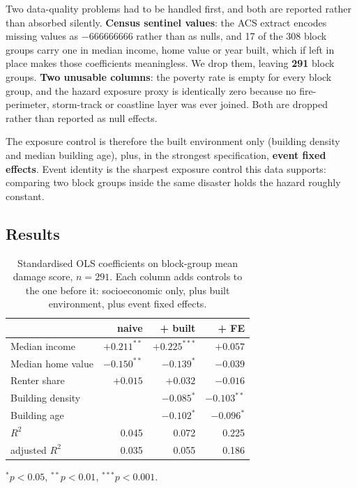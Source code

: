 \documentclass[10pt,twocolumn]{article}
\begin{document}
Two data-quality problems had to be handled first, and both are reported rather than absorbed
silently. \textbf{Census sentinel values}: the ACS extract encodes missing values as $-666666666$
rather than as nulls, and 17 of the 308 block groups carry one in median income, home value or year
built, which if left in place makes those coefficients meaningless. We drop them, leaving
\textbf{291} block groups. \textbf{Two unusable columns}: the poverty rate is empty for every block
group, and the hazard exposure proxy is identically zero because no fire-perimeter, storm-track or
coastline layer was ever joined. Both are dropped rather than reported as null effects.

The exposure control is therefore the built environment only (building density and median building
age), plus, in the strongest specification, \textbf{event fixed effects}. Event identity is the
sharpest exposure control this data supports: comparing two block groups inside the same disaster
holds the hazard roughly constant.

\subsection{Results}

\begin{table}[t]
\centering
\footnotesize
\caption{Standardised OLS coefficients on block-group mean damage score, $n = 291$. Each column adds
controls to the one before it: socioeconomic only, plus built environment, plus event fixed effects.}
\label{tab:socio}
\begin{tabular}{@{}lrrr@{}}
\toprule
& \textbf{naive} & \textbf{+ built} & \textbf{+ FE} \\
\midrule
Median income      & $+0.211^{**}$ & $+0.225^{***}$ & $+0.057$ \\
Median home value  & $-0.150^{**}$ & $-0.139^{*}$   & $-0.039$ \\
Renter share       & $+0.015$      & $+0.032$       & $-0.016$ \\
Building density   &               & $-0.085^{*}$   & $-0.103^{**}$ \\
Building age       &               & $-0.102^{*}$   & $-0.096^{*}$ \\
\midrule
$R^2$              & 0.045 & 0.072 & 0.225 \\
adjusted $R^2$     & 0.035 & 0.055 & 0.186 \\
\bottomrule
\end{tabular}
\vspace{2pt}
{\scriptsize $^{*}p<0.05$, $^{**}p<0.01$, $^{***}p<0.001$.}
\end{table}
\end{document}
